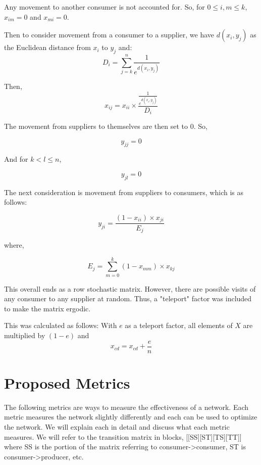 \documentclass[twoside,twocolumn]{article}
\begin{document}
Any movement to another consumer is not accounted for.
So, for $0 \leq i,m \leq k$, $x_{im} = 0$ and $x_{mi} = 0$.

Then to consider movement from a consumer to a supplier, we have $d(x_i, y_j)$ as the Euclidean distance from $x_i$ to $y_j$ and:
$$D_i = \sum_{j=k}^{n} \frac{1}{e^{d(x_i,y_j)}}$$

Then,
$$x_{ij} = x_{ii} \times \frac{\frac{1}{e^{d(x_i,y_j)}}}{D_i}$$ 

The movement from suppliers to themselves are then set to 0.
So,

$$y_{jj} = 0$$

And for $k < l \leq n$,

$$y_{jl} = 0$$

The next consideration is movement from suppliers to consumers, which is as follows:

$$y_{ji} = \frac{(1-x_{ii})\times x_{ji}}{E_j}$$

where, 

$$E_j = \sum_{m=0}^{k} (1-x_{mm})\times x_{kj}$$

This overall ends as a row stochastic matrix.
However, there are possible visits of any consumer to any supplier at random.
Thus, a "teleport" factor was included to make the matrix ergodic.

This was calculated as follows:
With $e$ as a teleport factor, all elements of $X$ are multiplied by $(1-e)$ and 
$$x_{cd} = x_{cd} + \frac{e}{n}$$









\section{Proposed Metrics}
The following metrics are ways to measure the effectiveness of a network.
Each metric measures the network slightly differently and each can be used to optimize the network.
We will explain each in detail and discuss what each metric measures.
We will refer to the transition matrix in blocks, [[SS][ST][TS][TT]] where SS is the portion of the matrix referring to consumer->consumer, ST is consumer->producer, etc.
\end{document}
